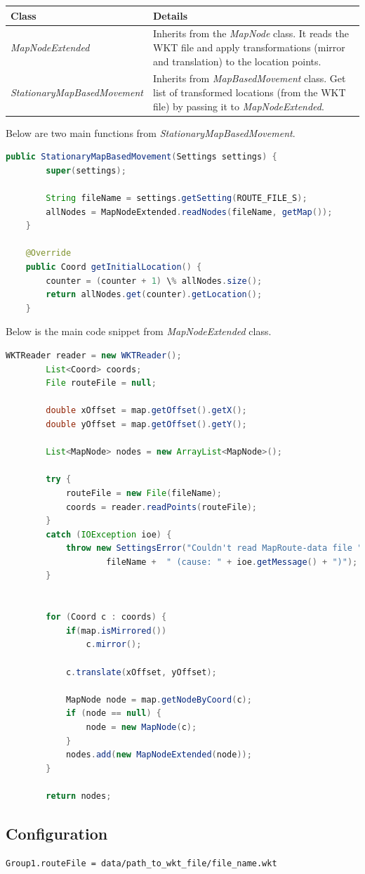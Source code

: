 	\begin{center}
    	 \label{tab:wktMapFiles} 
	    \begin{tabular}{ | l | p{11cm} |}
    		\hline
    		\textbf{Class} & \textbf{Details} \\ \hline
    		\textit{MapNodeExtended} & Inherits from the \textit{MapNode} class. It reads the WKT file and apply transformations (mirror and translation) to the location points. \\ \hline
    		\textit{StationaryMapBasedMovement} & Inherits from \textit{MapBasedMovement} class. Get list of transformed locations (from the WKT file) by passing it to \textit{MapNodeExtended}. \\ \hline
    	\end{tabular}
	\end{center}
\newpage
Below are two main functions from \textit{StationaryMapBasedMovement}.
\vspace{3mm}
\begin{lstlisting}[language=java]
	public StationaryMapBasedMovement(Settings settings) {
		super(settings);

		String fileName = settings.getSetting(ROUTE_FILE_S);
		allNodes = MapNodeExtended.readNodes(fileName, getMap());		
	}
		
	@Override
	public Coord getInitialLocation() {
		counter = (counter + 1) \% allNodes.size();
		return allNodes.get(counter).getLocation();
	}
\end{lstlisting}

\vspace{10mm}
Below is the main code snippet from \textit{MapNodeExtended} class.
\vspace{3mm}
\begin{lstlisting}[language=java]
		WKTReader reader = new WKTReader();
		List<Coord> coords;
		File routeFile = null;
		
		double xOffset = map.getOffset().getX();
		double yOffset = map.getOffset().getY();

		List<MapNode> nodes = new ArrayList<MapNode>();

		try {
			routeFile = new File(fileName);
			coords = reader.readPoints(routeFile);
		}
		catch (IOException ioe) {
			throw new SettingsError("Couldn't read MapRoute-data file " + 
					fileName + 	" (cause: " + ioe.getMessage() + ")");
		}


		for (Coord c : coords) {			
			if(map.isMirrored())
				c.mirror();
			
			c.translate(xOffset, yOffset);
			
			MapNode node = map.getNodeByCoord(c);
			if (node == null) {
				node = new MapNode(c);
			}
			nodes.add(new MapNodeExtended(node));			
		}
		
		return nodes;
\end{lstlisting}
\vspace{8mm}
\subsection{Configuration}
\begin{lstlisting}[language=bash]
Group1.routeFile = data/path_to_wkt_file/file_name.wkt
\end{lstlisting}